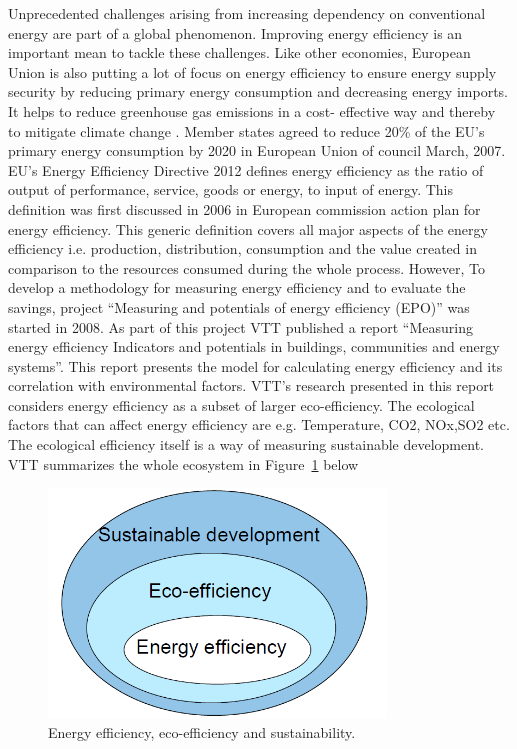 Unprecedented challenges arising from increasing dependency on conventional energy are part of a global phenomenon. Improving energy efficiency is an important mean to tackle these challenges. Like other economies, European Union is also putting a lot of focus on energy efficiency to ensure energy supply security  by reducing primary energy consumption and decreasing energy imports. It helps to reduce greenhouse gas emissions in a cost- effective way and thereby to mitigate climate change \cite{eu2012ee}. Member states agreed to reduce 20\% of the EU's primary energy consumption by 2020 in European Union of council March, 2007.  EU's Energy Efficiency Directive 2012 \cite{eu2012ee} defines energy efficiency as the ratio of output of performance, service, goods or energy, to input of energy. This definition was first discussed in 2006 in European commission action plan for energy efficiency. This generic definition covers all major aspects of the energy efficiency i.e. production, distribution, consumption and the value created in comparison to the resources consumed during the whole process.  However, To develop a methodology for measuring energy efficiency and to evaluate the savings, project ``Measuring and potentials of energy efficiency (EPO)'' was started in 2008\cite{arundel2009measuring}. As part of this project VTT published a report ``Measuring energy efficiency Indicators and potentials in buildings, communities and energy systems''\cite{forsstrommeasuring}. This report presents the model for calculating energy efficiency and its correlation with environmental factors.  VTT's research presented in this report considers energy efficiency as a subset of larger eco-efficiency. The ecological factors that can affect energy efficiency are e.g.  Temperature, CO2, NOx,SO2 etc. The ecological efficiency itself is a way of measuring sustainable development. VTT summarizes the whole ecosystem in Figure~\ref{fig:eco-effeciency} below

\begin{figure}[ht]
  \begin{center}
    \includegraphics[width=0.8\textwidth]{images/eco-effeciency.png}
    \caption{ Energy efficiency, eco-efficiency and sustainability\cite{forsstrommeasuring}.}
    \label{fig:eco-effeciency}
  \end{center}
\end{figure}

